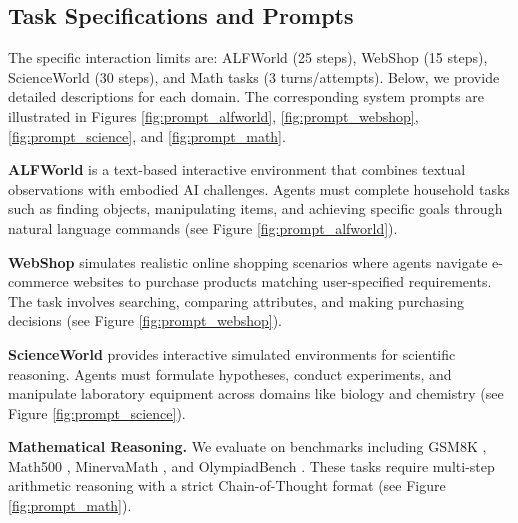 \subsection{Task Specifications and Prompts}
The specific interaction limits are: ALFWorld (25 steps), WebShop (15 steps), ScienceWorld (30 steps), and Math tasks (3 turns/attempts). Below, we provide detailed descriptions for each domain. The corresponding system prompts are illustrated in Figures \ref{fig:prompt_alfworld}, \ref{fig:prompt_webshop}, \ref{fig:prompt_science}, and \ref{fig:prompt_math}.

\textbf{ALFWorld} \cite{shridhar2020alfworld} is a text-based interactive environment that combines textual observations with embodied AI challenges. Agents must complete household tasks such as finding objects, manipulating items, and achieving specific goals through natural language commands (see Figure \ref{fig:prompt_alfworld}).

\textbf{WebShop} \cite{yao2022webshop} simulates realistic online shopping scenarios where agents navigate e-commerce websites to purchase products matching user-specified requirements. The task involves searching, comparing attributes, and making purchasing decisions (see Figure \ref{fig:prompt_webshop}).

\textbf{ScienceWorld} \cite{wang2022scienceworld} provides interactive simulated environments for scientific reasoning. Agents must formulate hypotheses, conduct experiments, and manipulate laboratory equipment across domains like biology and chemistry (see Figure \ref{fig:prompt_science}).

\textbf{Mathematical Reasoning.} We evaluate on benchmarks including GSM8K \cite{cobbe2021training}, Math500 \cite{lightman2023let}, MinervaMath \cite{lewkowycz2022solving}, and OlympiadBench \cite{gao2024omni}. These tasks require multi-step arithmetic reasoning with a strict Chain-of-Thought format (see Figure \ref{fig:prompt_math}).

